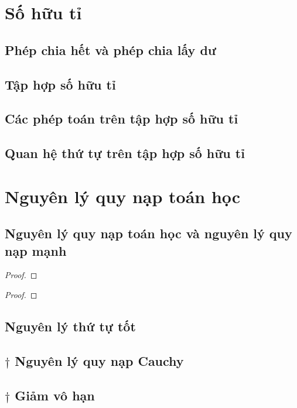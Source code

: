 \section{Số hữu tỉ}\label{section:rationals}

\subsection*{Phép chia hết và phép chia lấy dư}

\subsection*{Tập hợp số hữu tỉ}

\subsection*{Các phép toán trên tập hợp số hữu tỉ}

\subsection*{Quan hệ thứ tự trên tập hợp số hữu tỉ}

\section{Nguyên lý quy nạp toán học}\label{section:principle-of-mathematical-induction}

\subsection*{Nguyên lý quy nạp toán học và nguyên lý quy nạp mạnh}

\begin{theorem}
\end{theorem}

\begin{proof}
\end{proof}

\begin{theorem}
\end{theorem}

\begin{proof}
\end{proof}

\subsection*{Nguyên lý thứ tự tốt}

\subsection*{$\dagger$ Nguyên lý quy nạp Cauchy}

\subsection*{$\dagger$ Giảm vô hạn}
